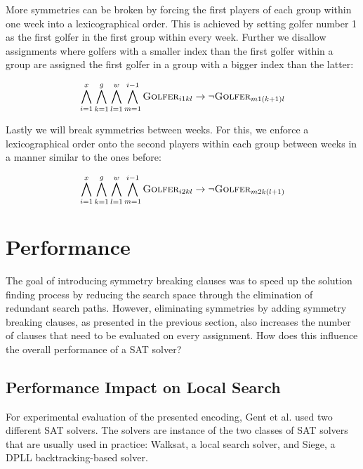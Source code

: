\documentclass[a4paper]{scrartcl}
\begin{document}
More symmetries can be broken by forcing the first players of each group within one week into a lexicographical order. This is achieved by setting golfer number 1 as the first golfer in the first group within every week. Further we disallow assignments where golfers with a smaller index than the first golfer within a group are assigned the first golfer in a group with a bigger index than the latter:

\begin{equation}
\centering
    \bigwedge \limits_{i=1}^x
    \bigwedge \limits_{k=1}^g
    \bigwedge \limits_{l=1}^w
    \bigwedge \limits_{m=1}^{i-1}
    \textsc{Golfer}_{i1kl}
    \to
    \neg \textsc{Golfer}_{m1(k+1)l}
\end{equation}

Lastly we will break symmetries between weeks. For this, we enforce a lexicographical order onto the second players within each group between weeks in a manner similar to the ones before:

\begin{equation}
\centering
    \bigwedge \limits_{i=1}^x
    \bigwedge \limits_{k=1}^g
    \bigwedge \limits_{l=1}^w
    \bigwedge \limits_{m=1}^{i-1}
    \textsc{Golfer}_{i2kl}
    \to
    \neg \textsc{Golfer}_{m2k(l+1)}
\end{equation}


\section{Performance}

The goal of introducing symmetry breaking clauses was to speed up the solution finding process by reducing the search space through the elimination of redundant search paths. However, eliminating symmetries by adding symmetry breaking clauses, as presented in the previous section, also increases the number of clauses that need to be evaluated on every assignment. How does this influence the overall performance of a SAT solver?


\subsection{Performance Impact on Local Search}

For experimental evaluation of the presented encoding, Gent et al. used two different SAT solvers. The solvers are instance of the two classes of SAT solvers that are usually used in practice: Walksat\cite{walksat2004}, a local search solver, and Siege\cite{Ryan04}, a DPLL backtracking-based solver.
\end{document}
